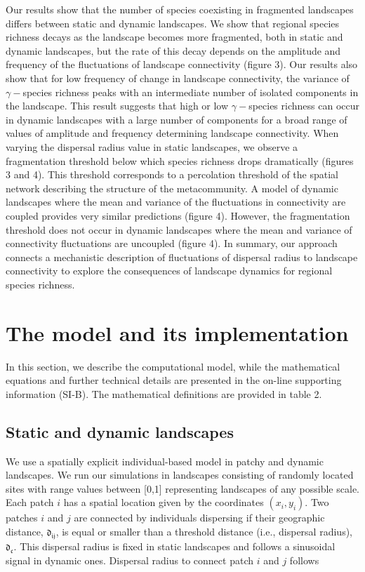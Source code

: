 \documentclass[12pt]{article}
\begin{document}
    Our results show that the number of species coexisting in fragmented landscapes differs between static and dynamic landscapes. We show that regional species richness decays as the landscape becomes more fragmented, both in static and dynamic landscapes, but the rate of this decay depends on the amplitude and frequency of the fluctuations of landscape connectivity (figure 3). Our results also show that for low frequency of change in landscape connectivity, the variance of $\gamma-$species richness peaks with an intermediate number of isolated components in the landscape. This result suggests that high or low $\gamma-$species richness can occur in dynamic landscapes with a large number of components for a broad range of values of amplitude and frequency determining landscape connectivity. When varying the dispersal radius value in static landscapes, we observe a fragmentation threshold below which species richness drops dramatically (figures 3 and 4). This threshold corresponds to a percolation threshold of the spatial network describing the structure of the metacommunity. A model of dynamic landscapes where the mean and variance of the fluctuations in connectivity are coupled provides very similar predictions (figure 4). However, the fragmentation threshold does not occur in dynamic landscapes where the mean and variance of connectivity fluctuations are uncoupled (figure 4). In summary, our approach connects a mechanistic description of fluctuations of dispersal radius to landscape connectivity to explore the consequences of landscape dynamics for regional species richness. 
    
    \section*{The model and its implementation}
    
    In this section, we describe the computational model, while the mathematical equations and further technical details are presented in the on-line supporting information (SI-B). The mathematical definitions are provided in table 2.
    
    \subsection*{Static and dynamic landscapes}
    
    We use a spatially explicit individual-based model in patchy and dynamic landscapes. We run our simulations in landscapes consisting of randomly located sites with range values between [0,1] representing landscapes of any possible scale. Each patch $i$ has a spatial location given by the coordinates $(x_{i}, y_{i})$. Two patches $i$ and $j$ are connected by individuals dispersing if their geographic distance, $\mathfrak{d_{ij}}$, is equal or smaller than a threshold distance (i.e., dispersal radius), $\mathfrak{d_{c}}$. This dispersal radius is fixed in static landscapes and follows a sinusoidal signal in dynamic ones. Dispersal radius to connect patch $i$ and $j$ follows
    
\end{document}
